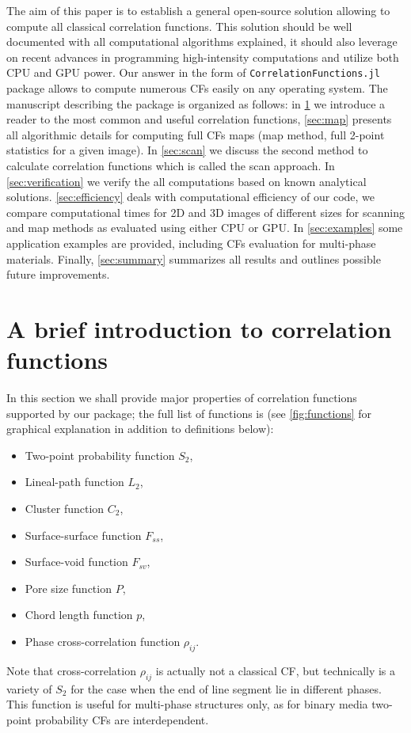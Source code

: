 \documentclass[reprint,amsmath,amssymb,aps,pre,showkeys,showpacs,nofootinbib]{revtex4-1}
\newcommand{\code}[1]{\colorbox{light-gray}{\texttt{#1}}}
\begin{document}
The aim of this paper is to establish a general open-source solution allowing to
compute all classical correlation functions. This solution should be well
documented with all computational algorithms explained, it should also leverage
on recent advances in programming high-intensity computations and utilize both
CPU and GPU power. Our answer in the form of \code{CorrelationFunctions.jl}
package allows to compute numerous CFs easily on any operating system. The
manuscript describing the package is organized as follows: in \cref{sec:math} we
introduce a reader to the most common and useful correlation functions,
\cref{sec:map} presents all algorithmic details for computing full CFs maps (map
method, full 2-point statistics for a given image). In \cref{sec:scan} we
discuss the second method to calculate correlation functions which is called the
scan approach. In \cref{sec:verification} we verify the all computations based on
known analytical solutions. \cref{sec:efficiency} deals with computational
efficiency of our code, we compare computational times for 2D and 3D images of
different sizes for scanning and map methods as evaluated using either CPU or
GPU. In \cref{sec:examples} some application examples are provided, including
CFs evaluation for multi-phase materials. Finally, \cref{sec:summary} summarizes
all results and outlines possible future improvements.

\section{A brief introduction to correlation functions}
\label{sec:math}
In this section we shall provide major properties of correlation functions
supported by our package; the full list of functions is 
(see \cref{fig:functions} for graphical explanation in addition to definitions below):
\begin{itemize}
\item Two-point probability function $S_2$,
\item Lineal-path function $L_2$,
\item Cluster function $C_2$,
\item Surface-surface function $F_{ss}$,
\item Surface-void function $F_{sv}$,
\item Pore size function $P$,
\item Chord length function $p$,
\item Phase cross-correlation function $\rho_{ij}$.
\end{itemize}
Note that cross-correlation $\rho_{ij}$ is actually not a classical CF, but
technically is a variety of $S_2$ for the case when the end of line segment lie
in different phases. This function is useful for multi-phase structures only, as
for binary media two-point probability CFs are interdependent.
\end{document}
